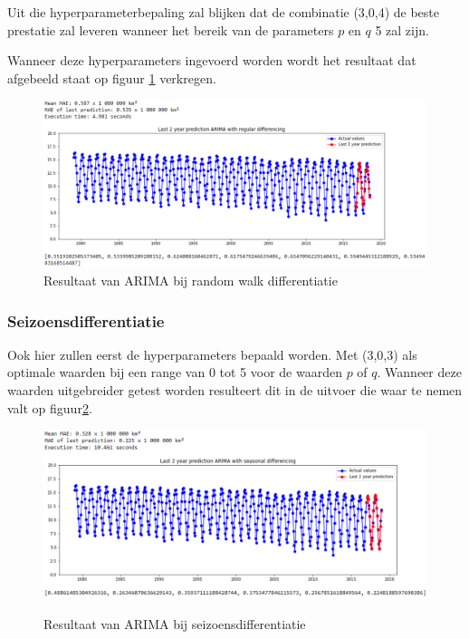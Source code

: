 Uit die hyperparameterbepaling zal blijken dat de combinatie (3,0,4) de beste prestatie zal leveren wanneer het bereik van de parameters $p$ en $q$ 5 zal zijn. 

Wanneer deze hyperparameters ingevoerd worden wordt het resultaat dat afgebeeld staat op figuur \ref{fig:uvsarimadiff} verkregen.

\begin{figure}
    \centering
    \caption{Resultaat van ARIMA bij random walk differentiatie}
    \label{fig:uvsarimadiff}
    \includegraphics[width=1\linewidth]{uv_s_arima_diff}
\end{figure}


\subsubsection{Seizoensdifferentiatie}

Ook hier zullen eerst de hyperparameters bepaald worden. Met (3,0,3) als optimale waarden bij een range van 0 tot 5 voor de waarden $p$ of $q$. Wanneer deze waarden uitgebreider getest worden resulteert dit in de uitvoer die waar te nemen valt op figuur\ref{fig:uvsarimasdiff}.


\begin{figure}
    \centering
    \caption{Resultaat van ARIMA bij seizoensdifferentiatie}
    \includegraphics[width=1\linewidth]{uv_s_arima_sdiff}
    \label{fig:uvsarimasdiff}
\end{figure}

